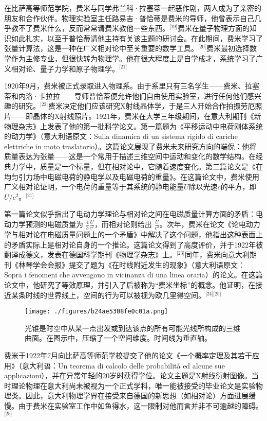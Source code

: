 在比萨高等师范学院，费米与同学弗兰科·拉塞蒂一起恶作剧，两人成为了亲密的朋友和合作伙伴。物理实验室主任路易吉·普恰蒂是费米的导师，他曾表示自己几乎教不了费米什么，反而常常请费米教他一些东西。\(^\text{[19]}\)费米在量子物理方面的知识如此扎实，以至于普恰蒂请他主持有关该主题的研讨会。在此期间，费米学习了张量计算法，这是一种在广义相对论中至关重要的数学工具。\(^\text{[20]}\)费米最初选择数学作为主修专业，但很快转为物理学。他在很大程度上是自学成才，系统学习了广义相对论、量子力学和原子物理学。\(^\text{[21]}\)

1920年9月，费米被正式录取进入物理系。由于系里只有三名学生——费米、拉塞蒂和内洛·卡拉拉——导师普恰蒂便允许他们自由使用实验室，进行任何他们感兴趣的研究。\(^\text{[22]}\)费米决定他们应该研究X射线晶体学，于是三人开始合作拍摄劳厄照片——即晶体的X射线照片。1921年，费米在大学三年级期间，在意大利期刊《新物理杂志》上发表了他的第一批科学论文。第一篇题为《平移运动中电荷刚体系统的动力学》（意大利语原文：Sulla dinamica di un sistema rigido di cariche elettriche in moto traslatorio）。这篇论文展现了费米未来研究方向的端倪：他将质量表达为张量——这是一个常用于描述三维空间中运动和变化的数学结构。在经典力学中，质量是一个标量，但在相对论中，它随着速度变化。第二篇论文是《在均匀引力场中电磁电荷的静电学以及电磁电荷的重量》。在这篇论文中，费米使用广义相对论证明，一个电荷的重量等于其系统的静电能量$U$除以光速$c$的平方，即 $U/c^2$。\(^\text{[21]}\)

第一篇论文似乎指出了电动力学理论与相对论之间在电磁质量计算方面的矛盾：电动力学预测的电磁质量为 $\frac{4}{3} \frac{U}{c^2}$，而相对论则给出 $\frac{U}{c^2}$。次年，费米在论文《论电动力学与相对论在电磁质量问题上的一个矛盾》中解决了这个问题，他指出这种表面上的矛盾实际上是相对论自身的一个推论。这篇论文得到了高度评价，并于1922年被翻译成德文，发表在德国科学期刊《物理学杂志》上。\(^\text{[23]}\)同年，费米向意大利期刊《林琴学会会报》提交了题为《在时线附近发生的现象》（意大利语原文：Sopra i fenomeni che avvengono in vicinanza di una linea oraria）的论文。在这篇论文中，他研究了等效原理，并引入了后被称为“费米坐标”的概念。他证明，在接近某条时线的世界线上，空间的行为可以被视为欧几里得空间。\(^\text{[24][25]}\)
\begin{figure}[ht]
\centering
\texttt{[image: ./figures/b24ae5308fe0c01a.png]}
\caption{光锥是时空中从某一点出发或到达该点的所有可能光线所构成的三维曲面。在图示中，压缩了一个空间维度。时间线为垂直轴。} \label{fig_ELK_3}
\end{figure}
费米于1922年7月向比萨高等师范学校提交了他的论文《一个概率定理及其若干应用》（意大利语：Un teorema di calcolo delle probabilità ed alcune sue applicazioni），并在异常年轻的20岁时获得学位。论文主题是X射线衍射图像。当时理论物理在意大利尚未被视为一个正式学科，唯一能被接受的毕业论文是实验物理类。因此，意大利物理学界在接受来自德国的新思想（如相对论）方面进展缓慢。由于费米在实验室工作中如鱼得水，这一限制对他而言并非不可逾越的障碍。\(^\text{[25]}\)

